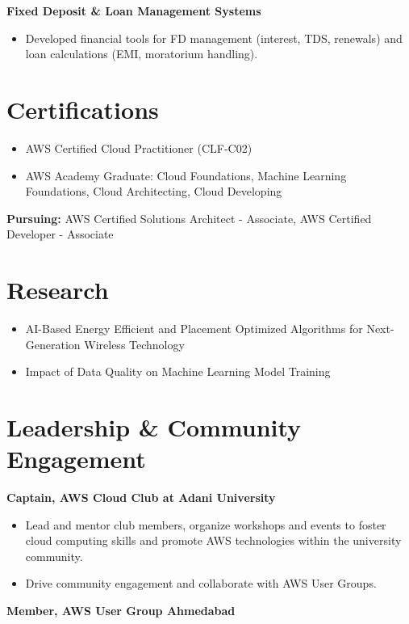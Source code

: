 \documentclass[10pt,a4paper]{article}
\begin{document}
\textbf{Fixed Deposit \& Loan Management Systems}
\begin{itemize}
    \item Developed financial tools for FD management (interest, TDS, renewals) and loan calculations (EMI, moratorium handling).
\end{itemize}

\section*{Certifications}
\begin{itemize}
    \item AWS Certified Cloud Practitioner (CLF-C02)
    \item AWS Academy Graduate: Cloud Foundations, Machine Learning Foundations, Cloud Architecting, Cloud Developing
\end{itemize}
\textbf{Pursuing:} AWS Certified Solutions Architect - Associate, AWS Certified Developer - Associate

\section*{Research}
\begin{itemize}
    \item AI-Based Energy Efficient and Placement Optimized Algorithms for Next-Generation Wireless Technology
    \item Impact of Data Quality on Machine Learning Model Training
\end{itemize}

\section*{Leadership \& Community Engagement}
\textbf{Captain, AWS Cloud Club at Adani University}
\begin{itemize}
    \item Lead and mentor club members, organize workshops and events to foster cloud computing skills and promote AWS technologies within the university community.
    \item Drive community engagement and collaborate with AWS User Groups.
\end{itemize}
\textbf{Member, AWS User Group Ahmedabad}
\end{document}
